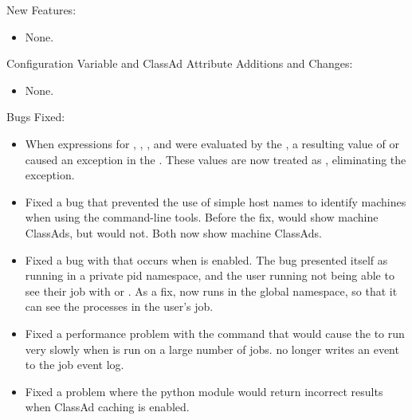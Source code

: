 \noindent New Features:

\begin{itemize}

\item None.

\end{itemize}

\noindent Configuration Variable and ClassAd Attribute Additions and Changes:

\begin{itemize}

\item None.

\end{itemize}

\noindent Bugs Fixed:

\begin{itemize}

\item When expressions for ,
, , and 
were evaluated by the ,
a resulting value of
 or  caused an exception in the .
These values are now treated as ,
eliminating the exception.

\item Fixed a bug that prevented the use of simple host names to identify
machines when using the command-line tools. Before the fix,
 would show machine ClassAds, but
 would not.
Both now show machine ClassAds.

\item Fixed a bug with  that occurs when
 is enabled.
The bug presented itself as 
running in a private pid namespace, 
and the user running  not being able to see 
their job with  or .
As a fix,  now runs in the global namespace, 
so that it can see the processes in the user's job.

\item Fixed a performance problem with the  command 
that would cause the  to run very slowly when 
 is run on a large number of jobs.  
 no longer writes an event to the job event log. 

\item Fixed a problem where the  python module would return
incorrect results when ClassAd caching is enabled.


\end{itemize}
